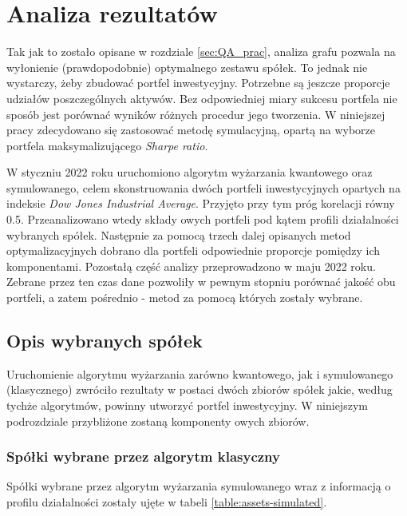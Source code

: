 \documentclass[12pt,a4paper,twoside,openany]{book}
\begin{document}
\chapter{Analiza rezultatów}
\label{sec:ar}

Tak jak to zostało opisane w rozdziale \ref{sec:QA_prac}, analiza grafu pozwala na wyłonienie (prawdopodobnie) optymalnego zestawu spółek.
To jednak nie wystarczy, żeby zbudować portfel inwestycyjny.
Potrzebne są jeszcze proporcje udziałów poszczególnych aktywów.
Bez odpowiedniej miary sukcesu portfela nie sposób jest porównać wyników różnych procedur jego tworzenia.
W niniejszej pracy zdecydowano się zastosować metodę symulacyjną, opartą na wyborze portfela maksymalizującego \textit{Sharpe ratio}.

W styczniu 2022 roku uruchomiono algorytm wyżarzania kwantowego oraz symulowanego, celem skonstruowania dwóch portfeli inwestycyjnych opartych na indeksie \textit{Dow Jones Industrial Average}.
Przyjęto przy tym próg korelacji równy 0.5.
Przeanalizowano wtedy składy owych portfeli pod kątem profili działalności wybranych spółek.
Następnie za pomocą trzech dalej opisanych metod optymalizacyjnych dobrano dla portfeli odpowiednie proporcje pomiędzy ich komponentami.
Pozostałą część analizy przeprowadzono w maju 2022 roku.
Zebrane przez ten czas dane pozwoliły w pewnym stopniu porównać jakość obu portfeli, a zatem pośrednio - metod za pomocą których zostały wybrane.

\section{Opis wybranych spółek}

Uruchomienie algorytmu wyżarzania zarówno kwantowego, jak i symulowanego (klasycznego) zwróciło rezultaty w postaci dwóch zbiorów spółek jakie, według tychże algorytmów, powinny utworzyć portfel inwestycyjny.
W niniejszym podrozdziale przybliżone zostaną komponenty owych zbiorów.

\subsection{Spółki wybrane przez algorytm klasyczny}

Spółki wybrane przez algorytm wyżarzania symulowanego wraz z informacją o profilu działalności zostały ujęte w tabeli \ref{table:assets-simulated}.
\end{document}
